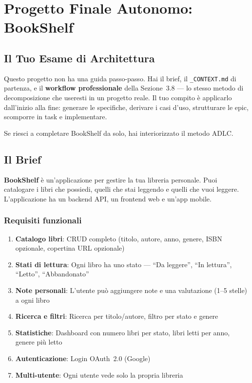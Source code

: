 \chapter{Progetto Finale Autonomo: BookShelf}

\section*{Il Tuo Esame di Architettura}

Questo progetto non ha una guida passo-passo. Hai il brief, il \texttt{\_CONTEXT.md} di partenza, e il \textbf{workflow professionale} della Sezione~3.8 --- lo stesso metodo di decomposizione che useresti in un progetto reale. Il tuo compito è applicarlo dall'inizio alla fine: generare le specifiche, derivare i casi d'uso, strutturare le epic, scomporre in task e implementare.

Se riesci a completare BookShelf da solo, hai interiorizzato il metodo ADLC.

\section{Il Brief}

\textbf{BookShelf} è un'applicazione per gestire la tua libreria personale. Puoi catalogare i libri che possiedi, quelli che stai leggendo e quelli che vuoi leggere. L'applicazione ha un backend API, un frontend web e un'app mobile.

\subsection{Requisiti funzionali}

\begin{enumerate}
  \item \textbf{Catalogo libri}: CRUD completo (titolo, autore, anno, genere, ISBN opzionale, copertina URL opzionale)
  \item \textbf{Stati di lettura}: Ogni libro ha uno stato --- ``Da leggere'', ``In lettura'', ``Letto'', ``Abbandonato''
  \item \textbf{Note personali}: L'utente può aggiungere note e una valutazione (1--5 stelle) a ogni libro
  \item \textbf{Ricerca e filtri}: Ricerca per titolo/autore, filtro per stato e genere
  \item \textbf{Statistiche}: Dashboard con numero libri per stato, libri letti per anno, genere più letto
  \item \textbf{Autenticazione}: Login OAuth~2.0 (Google)
  \item \textbf{Multi-utente}: Ogni utente vede solo la propria libreria
\end{enumerate}

